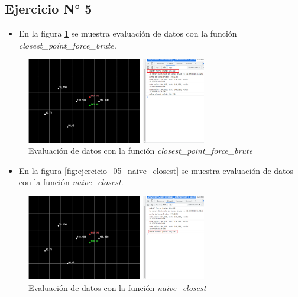 \documentclass{article}
\begin{document}
\subsection{Ejercicio N° 5}
\begin{itemize}
	\item En la figura \ref{fig:ejercicio_05_closest_point_brute_force} se muestra evaluación de datos con la función \textit{closest\_point\_force\_brute}.
\end{itemize}
\begin{figure}[h!]
	\centering
	\includegraphics[width=0.7\textwidth]{img/ejercicio_05_closest_point_brute_force.png}
	\caption{Evaluación de datos con la función \textit{closest\_point\_force\_brute}}
	\label{fig:ejercicio_05_closest_point_brute_force}
\end{figure}

\begin{itemize}
	\item En la figura \ref{fig:ejercicio_05_naive_closest} se muestra evaluación de datos con la función \textit{naive\_closest}.
\end{itemize}
\begin{figure}[h!]
	\centering
	\includegraphics[width=0.7\textwidth]{img/jercicio_05_naive_closest.png}
	\caption{Evaluación de datos con la función \textit{naive\_closest}}
	\label{fig:jercicio_05_naive_closest}
\end{figure}

\clearpage
\end{document}
